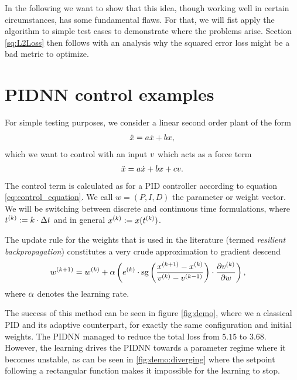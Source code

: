 \documentclass{article}
\begin{document}
    In the following we want to show that this idea, though working well in certain circumstances, 
    has some fundamental flaws. For that, we will fist apply the algorithm to simple test cases to 
    demonstrate where the problems arise. Section \ref{sq:L2Loss} then follows with an analysis why 
    the squared error loss might be a bad metric to optimize. 






  \section{PIDNN control examples}
    For simple testing purposes, we  consider a linear second order plant of the form
    \begin{align}
        \ddot{x} = a \dot{x} + b x,
    \end{align}
    which we want to control with an input $v$ which acts as a force term
    \begin{align}
        \ddot{x} = a \dot{x} + b x + c v. \label{eq:qe_of_motion_system}
    \end{align}
    The control term is calculated as for a PID controller according to equation 
    \eqref{eq:control_equation}. 
    We call $w = (P, I, D)$ the parameter or weight vector. 
    We will be switching between discrete and continuous time formulations, 
    where ${t}^{(k)} := k \cdot \Delta t$ and in general ${x}^{(k)} := x({t}^{(k)})$.


    The update rule for the weights that is used in the literature \cite{cong_novel_2005} 
    (termed \emph{resilient backpropagation}) constitutes a very crude approximation to gradient 
    descend
    \begin{align}
        {w}^{(k+1)} &= {w}^{(k)} + \alpha \left( {e}^{(k)} \cdot 
                        \operatorname{sg} \left(\frac{{x}^{(k+1)} - {x}^{(k)}}{{v}^{(k)} 
                        - {v}^{(k-1)}}\right) \cdot 
                        \frac{\partial {v}^{(k)}}{\partial w}\right), \label{eq:diffq_pidnn}
    \end{align}
    where $\alpha$ denotes the learning rate. 

    The success of this method can be seen in figure \ref{fig:demo}, where we a classical PID 
    and its adaptive counterpart, for exactly the same configuration and initial weights. 
    The PIDNN managed to reduce the total loss from $5.15$ to $3.68$. However, the learning drives 
    the PIDNN towards a parameter regime where it becomes unstable, as can be seen in 
    \ref{fig:demo:diverging} where the setpoint following a rectangular function makes it impossible
    for the learning to stop. 
\end{document}
